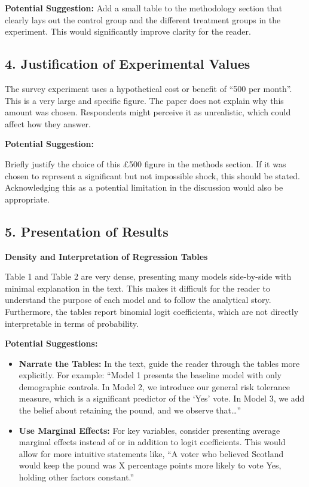 \documentclass[
  letterpaper,
  DIV=11,
  numbers=noendperiod]{scrartcl}
\providecommand{\tightlist}{%
  \setlength{\itemsep}{0pt}\setlength{\parskip}{0pt}}\usepackage{longtable,booktabs,array}
\begin{document}
\textbf{Potential Suggestion:} Add a small table to the methodology
section that clearly lays out the control group and the different
treatment groups in the experiment. This would significantly improve
clarity for the reader.

\subsection{4. Justification of Experimental
Values}\label{justification-of-experimental-values}

The survey experiment uses a hypothetical cost or benefit of ``500 per
month''. This is a very large and specific figure. The paper does not
explain why this amount was chosen. Respondents might perceive it as
unrealistic, which could affect how they answer.

\textbf{Potential Suggestion:}

Briefly justify the choice of this £500 figure in the methods section.
If it was chosen to represent a significant but not impossible shock,
this should be stated. Acknowledging this as a potential limitation in
the discussion would also be appropriate.

\subsection{5. Presentation of Results}\label{presentation-of-results}

\textbf{Density and Interpretation of Regression Tables}

Table 1 and Table 2 are very dense, presenting many models side-by-side
with minimal explanation in the text. This makes it difficult for the
reader to understand the purpose of each model and to follow the
analytical story. Furthermore, the tables report binomial logit
coefficients, which are not directly interpretable in terms of
probability.

\textbf{Potential Suggestions:}

\begin{itemize}
\tightlist
\item
  \textbf{Narrate the Tables:} In the text, guide the reader through the
  tables more explicitly. For example: ``Model 1 presents the baseline
  model with only demographic controls. In Model 2, we introduce our
  general risk tolerance measure, which is a significant predictor of
  the `Yes' vote. In Model 3, we add the belief about retaining the
  pound, and we observe that\ldots{}''
\item
  \textbf{Use Marginal Effects:} For key variables, consider presenting
  average marginal effects instead of or in addition to logit
  coefficients. This would allow for more intuitive statements like, ``A
  voter who believed Scotland would keep the pound was X percentage
  points more likely to vote Yes, holding other factors constant.''
\end{itemize}
\end{document}
